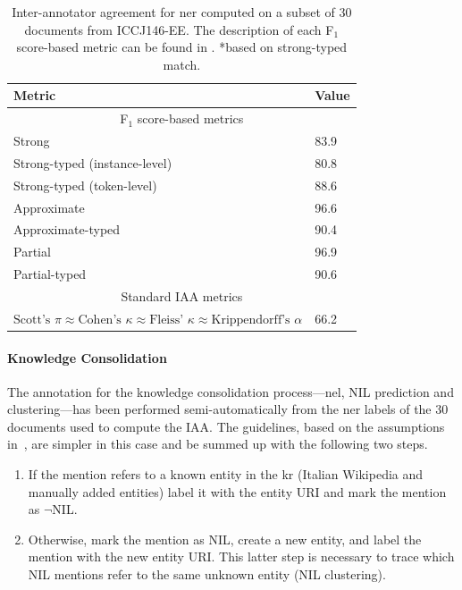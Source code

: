 \begin{table}[]
\centering
\begin{tabular}{l|l}
\toprule
\textbf{Metric}                     & \textbf{Value} \\\toprule
\multicolumn{2}{c}{F$_1$ score-based metrics} \\\midrule
Strong                              & 83.9           \\
Strong-typed (instance-level)       & 80.8           \\
Strong-typed (token-level)          & 88.6           \\
Approximate                         & 96.6           \\
Approximate-typed                   & 90.4           \\
Partial                             & 96.9           \\
Partial-typed                       & 90.6           \\\midrule
\multicolumn{2}{c}{Standard IAA metrics} \\\midrule
$\text{Scott's~}\pi \approx \text{Cohen's~}\kappa \approx \text{Fleiss'~}\kappa \approx \text{Krippendorff's~}\alpha$
 & 66.2           \\\bottomrule
\end{tabular}
\caption[Inter-annotator agreement for \ac{ner} on ICCJ146-EE]{Inter-annotator agreement for \ac{ner} computed on a subset of 30 documents from ICCJ146-EE. The description of each F$_1$ score-based metric can be found in . *based on strong-typed match.}
\label{tab:iaa}
\end{table}


\paragraph{Knowledge Consolidation}
The annotation for the knowledge consolidation process---\ie \ac{nel}, NIL prediction and clustering---has been performed semi-automatically from the \ac{ner} labels of the 30 documents used to compute the IAA. The guidelines, based on the assumptions in~\cite{jha2017all}, are simpler in this case and be summed up with the following two steps.

\begin{enumerate}
    \item If the mention refers to a known entity in the \ac{kr} (Italian Wikipedia and manually added entities) label it with the entity URI and mark the mention as $\neg$NIL.
    \item Otherwise, mark the mention as NIL, create a new entity, and label the mention with the new entity URI. This latter step is necessary to trace which NIL mentions refer to the same unknown entity (NIL clustering). 
\end{enumerate}

